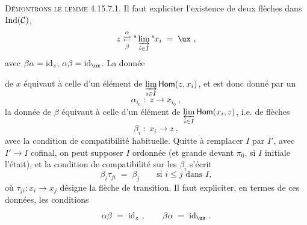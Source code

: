 \textsc{Démontrons le lemme} 4.15.7.1. Il faut expliciter l'existence de deux flèches dans $\operatorname{Ind}(\mathcal{C})$,
\[
z \underset{\beta}{\overset{\alpha}{\rightleftarrows}} \text{"}\varinjlim_{i\in I}\text{"} x_i \;=\; \ux\ ,
\]
avec $\beta\alpha = \mathrm{id}_z$, $\alpha\beta = \id_{\ux}$. La donnée

de $x$ équivaut à celle d'un élément de $\varinjlim\limits_{i\in I} \mathsf{Hom}(z,x_i)$, et est donc donné par un %
\[
\alpha_{i_0} \;:\; z \longrightarrow x_{i_0}\ ,
\]
la donnée de $\beta$ équivaut à celle d'un élément de $\varprojlim\limits_{i\in I} \mathsf{Hom}(x_i,z)$, i.e. de flèches
\[
\beta_i \;:\; x_i \longrightarrow z\ ,
\]
avec la condition de compatibilité habituelle. Quitte à remplacer $I$ par $I'$, avec $I' \longrightarrow I$ cofinal, on peut supposer $I$ ordonnée (et grande devant $\pi_0$, si $I$ initiale l'était), et la condition de compatibilité sur les $\beta_i$ s'écrit
\[
\beta_i\tau_{ji} \;=\; \beta_j \qquad \text{si } i \leqslant j \text{ dans } I,
\]
où $\tau_{ji} : x_i \longrightarrow x_j$ désigne la flèche de transition. Il faut expliciter, en termes de ces données, les conditions
\[
\alpha\beta \;=\; \id_z\ , \qquad \beta\alpha \;=\; \id_{\ux}\ .
\]

